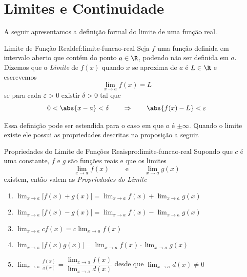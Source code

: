 \section{Limites e Continuidade}
\label{sec:limites_Continuidade}

A seguir apresentamos a definição formal do limite de uma função real.

\begin{definicao}{Limite de Função Real}{def:limite-funcao-real}
  Seja $f$ uma função definida em intervalo aberto que contém do ponto $a\in\R$,
  podendo não ser definida em $a$. Dizemos que o \emph{Limite}
  de $f(x)$ quando $x$ se aproxima de $a$ é $L\in\R$ e escrevemos
  \[
  \lim_{x\to a} f(x) = L
  \]
  se para cada $\varepsilon>0$ existir $\delta>0$ tal que
  \[
  0 < \abs{x-a} < \delta \qquad\Rightarrow\qquad \abs{f(x)-L} < \varepsilon
  \]
\end{definicao}

Essa definição pode ser estendida para o caso em que $a$ é $\pm\infty$.
Quando o limite existe ele possui as propriedades descritas na proposição a seguir.

\begin{proposicao}{Propriedades do Limite de Funções Reais}{pro:limite-funcao-real}
  Supondo que $c$ é uma constante, $f$ e $g$ são funções reais e que os limites
  \[
  \lim_{x\to a} f(x) \qquad\text{ e }\qquad \lim_{x\to a} g(x)
  \]
  existem, então valem as \emph{Propriedades do Limite}
  \begin{enumerate}[parsep=11pt]
    \item \( \lim_{x\to a} \Big[ f(x) + g(x) \Big] = \lim_{x\to a} f(x) + \lim_{x\to a} g(x) \)
    \item \( \lim_{x\to a} \Big[ f(x) - g(x) \Big] = \lim_{x\to a} f(x) - \lim_{x\to a} g(x) \)
    \item \( \lim_{x\to a} cf(x) = c \lim_{x\to a} f(x) \)
    \item \( \lim_{x\to a} \Big[ f(x)g(x) \Big] = \lim_{x\to a} f(x) \cdot \lim_{x\to a} g(x) \)
    \item \( \lim_{x\to a} \frac{f(x)}{g(x)} = \dfrac{\displaystyle\lim_{x\to a} f(x)}
    {\displaystyle\lim_{x\to a} d(x)} \)
    \qquad desde que \(\lim_{x\to a} d(x) \neq 0\)
  \end{enumerate}
\end{proposicao}

